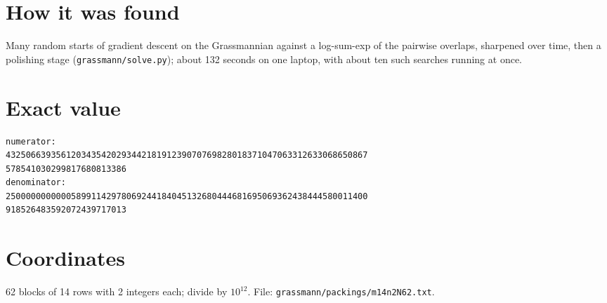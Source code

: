 \documentclass[11pt,a4paper]{article}
\begin{document}
\section{How it was found}
Many random starts of gradient descent on the Grassmannian against a log-sum-exp of the pairwise overlaps, sharpened over time, then a polishing stage (\texttt{grassmann/solve.py}); about 132 seconds on one laptop, with about ten such searches running at once.


\appendix
\section{Exact value}
{\small
\begin{verbatim}
numerator:
432506639356120343542029344218191239070769828018371047063312633068650867
578541030299817680813386
denominator:
250000000000058991142978069244184045132680444681695069362438444580011400
918526483592072439717013
\end{verbatim}}

\section{Coordinates}
62 blocks of 14 rows with 2 integers each; divide by $10^{12}$. File: \texttt{grassmann/packings/m14n2N62.txt}.
{\tiny
\begin{multicols}{4}
\end{multicols}}
\end{document}
